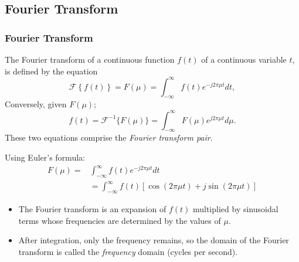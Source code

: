 \subsection{Fourier Transform}


\begin{frame}
\frametitle{Fourier Transform}
The Fourier transform of a continuous function $f(t)$ of a continuous variable $t$, is defined by the equation
\begin{equation}
\boxed{
\mathcal{F}\left \{ f(t) \right \} = F(\mu) = \int_{-\infty}^{\infty} f(t) e^{-j2\pi \mu t} dt
},
\end{equation}
Conversely, given $F(\mu)$;
\begin{equation}
\boxed{
f(t) = \mathcal{F}^{-1}\{F(\mu)\} = \int_{-\infty}^{\infty} F(\mu) e^{j2\pi \mu t} d\mu
}.
\end{equation}
These two equations comprise the \textit{Fourier transform pair}.
\end{frame}


\begin{frame}
Using Euler's formula:
\begin{equation}
\begin{split}
F(\mu) = & \int_{-\infty}^{\infty} f(t) e^{-j2\pi \mu t} dt \\
&= \int_{-\infty}^{\infty} f(t) [ \cos(2\pi \mu t) + j\sin(2\pi \mu t) ]
\end{split}
\end{equation}
\begin{itemize}
\item The Fourier transform is an expansion of $f(t)$ multiplied by sinusoidal terms whose frequencies are determined by the values of $\mu$.
\item After integration, only the frequency remains, so the domain of the Fourier transform is called the \textit{frequency} domain (cycles per second).
\end{itemize}
\end{frame}


